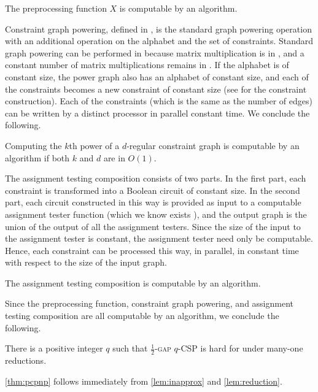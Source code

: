 \documentclass{article}
\begin{document}
\begin{lemma}
  The preprocessing function $X$ is computable by an \NC{} algorithm.
\end{lemma}

Constraint graph powering, defined in \autocite[Section~1.2]{dinur07}, is the standard graph powering operation with an additional operation on the alphabet and the set of constraints.
Standard graph powering can be performed in \NC{} because matrix multiplication is in \NC{}, and a constant number of matrix multiplications remains in \NC{}.
If the alphabet is of constant size, the power graph also has an alphabet of constant size, and each of the constraints becomes a new constraint of constant size (see \autocite[Section~1.2]{dinur07} for the constraint construction).
Each of the constraints (which is the same as the number of edges) can be written by a distinct processor in parallel constant time.
We conclude the following.

\begin{lemma}
  Computing the $k$th power of a $d$-regular constraint graph is computable by an \NC{} algorithm if both $k$ and $d$ are in $O(1)$.
\end{lemma}

The assignment testing composition \autocite[Definition~5.1]{dinur07} consists of two parts.
In the first part, each constraint is transformed into a Boolean circuit of constant size.
In the second part, each circuit constructed in this way is provided as input to a computable assignment tester function (which we know exists \autocite[Theorem~5.1]{dinur07}), and the output graph is the union of the output of all the assignment testers.
Since the size of the input to the assignment tester is constant, the assignment tester need only be computable.
Hence, each constraint can be processed this way, in parallel, in constant time with respect to the size of the input graph.

\begin{lemma}
  The assignment testing composition is computable by an \NC{} algorithm.
\end{lemma}

Since the preprocessing function, constraint graph powering, and assignment testing composition are all computable by an \NC{} algorithm, we conclude the following.

\begin{lemma}\label{lem:reduction}
  There is a positive integer $q$ such that \textsc{$\frac{1}{2}$-gap $q$-CSP} is hard for \NP{} under \NC{} many-one reductions.
\end{lemma}

\autoref{thm:pcpnp} follows immediately from \autoref{lem:inapprox} and \autoref{lem:reduction}.

\printbibliography
\end{document}
